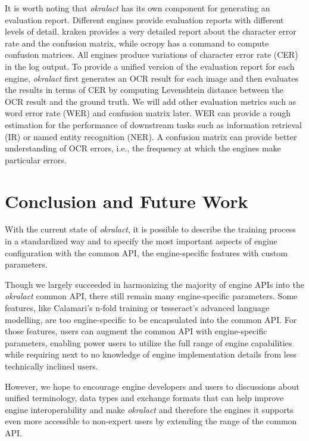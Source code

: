 \documentclass[sigconf]{acmart}
\begin{document}
It is worth noting that \textit{okralact} has its own component for generating an evaluation report. Different engines provide evaluation reports with different levels of detail. kraken provides a very detailed report about the character error rate and the confusion matrix, while ocropy has a command to compute confusion matrices. All engines produce variations of character error rate (CER) in the log output. To provide a unified version of the evaluation report for each engine, \textit{okralact} first generates an OCR result for each image and then evaluates the results in terms of CER by computing Levenshtein distance between the OCR result and the ground truth. We will add other evaluation metrics such as word error rate (WER) and confusion matrix later. WER can provide a rough estimation for the performance of downstream tasks such as information retrieval (IR) or named entity recognition (NER). A confusion matrix can provide better understanding of OCR errors, i.e., the frequency at which the engines make particular errors.

\section{Conclusion and Future Work}

With the current state of \textit{okralact}, it is possible to describe the
training process in a standardized way and to specify the most important
aspects  of engine configuration with the common API, the engine-specific
features with custom parameters.


Though we largely succeeded in harmonizing the majority of engine APIs into the
\textit{okralact} common API, there still remain many engine-specific parameters. Some
features, like Calamari's n-fold training or tesseract's advanced language
modelling, are too engine-specific to be encapsulated into the common API. 
For those features, users can augment the common API with engine-specific parameters, 
enabling power users to utilize the full range of engine capabilities while requiring 
next to no knowledge of engine implementation details from less technically inclined users.

However, we hope to encourage engine developers and
users to discussions about unified terminology, data types and exchange 
formats that can help improve engine interoperability and 
make \textit{okralact} and therefore the engines it supports even more
accessible to non-expert users by extending the range of the common API.
\end{document}
